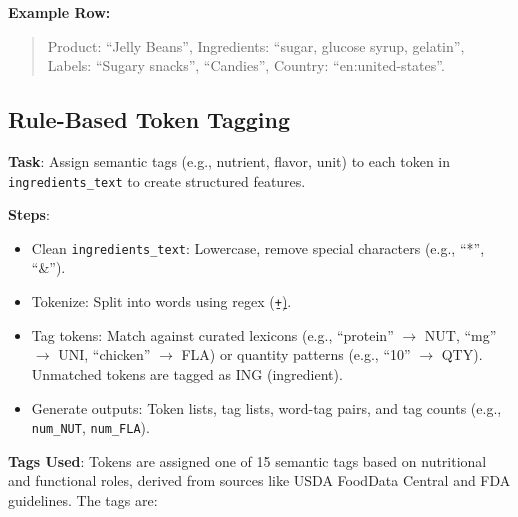 \documentclass[11pt]{article}
\begin{document}
\textbf{Example Row:}
\begin{quote}
Product: ``Jelly Beans'', Ingredients: ``sugar, glucose syrup, gelatin'', Labels: ``Sugary snacks'', ``Candies'', Country: ``en:united-states''.
\end{quote}

\subsection{Rule-Based Token Tagging}

\textbf{Task}: Assign semantic tags (e.g., nutrient, flavor, unit) to each token in \texttt{ingredients\_text} to create structured features.

\textbf{Steps}:
\begin{itemize}[noitemsep]
    \item Clean \texttt{ingredients\_text}: Lowercase, remove special characters (e.g., ``*'', ``\&'').
    \item Tokenize: Split into words using regex (\texttt{\string\b\string\w+\string\b}).
    \item Tag tokens: Match against curated lexicons (e.g., ``protein'' $\to$ NUT, ``mg'' $\to$ UNI, ``chicken'' $\to$ FLA) or quantity patterns (e.g., ``10'' $\to$ QTY). Unmatched tokens are tagged as ING (ingredient).
    \item Generate outputs: Token lists, tag lists, word-tag pairs, and tag counts (e.g., \texttt{num\_NUT}, \texttt{num\_FLA}).
\end{itemize}

\textbf{Tags Used}: Tokens are assigned one of 15 semantic tags based on nutritional and functional roles, derived from sources like USDA FoodData Central and FDA guidelines. The tags are:
\end{document}
